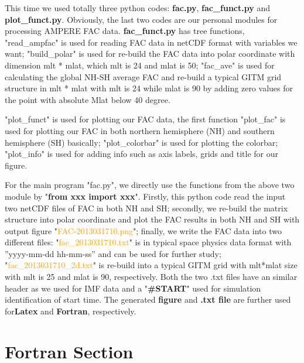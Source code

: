 \documentclass[12pt, letterpaper]{article} %
\begin{document}
\noindent This time we used totally three python codes: \textbf{fac.py}, \textbf{fac\_{}funct.py} and \textbf{plot\_{}funct.py}. Obviously, the last two codes are our personal modules for processing AMPERE FAC data.  \textbf{fac\_{}funct.py} has tree functions, "read\_{}ampfac" is used for reading FAC data in netCDF format with variables we want; "build\_{}polar" is used for re-build the FAC data into polar coordinate with dimension mlt * mlat, which mlt is 24 and mlat is 50; "fac\_{}ave" is used for calculating the global NH-SH average FAC and re-build a typical GITM grid structure in mlt * mlat with mlt is 24 while mlat is 90 by adding zero values for the point with absolute Mlat below 40 degree. 


\noindent "plot\_{}funct" is used for plotting our FAC data, the first function "plot\_{}fac" is used for plotting our FAC in both northern hemisphere (NH) and southern hemisphere (SH) basically; "plot\_{}colorbar" is used for plotting the colorbar; "plot\_{}info" is used for adding info such as axis labels, grids and title for our figure. 

\noindent For the main program "fac.py", we directly use the functions from the above two module by "\textbf{from xxx import xxx}". Firstly, this python code read the input two netCDF files of FAC in both NH and SH; secondly, we re-build the matrix structure into polar coordinate and plot the FAC results in both NH and SH with output figure "\textcolor{orange}{FAC-2013031710.png}"; finally, we write the FAC data into two different files: "\textcolor{orange}{fac\_{}2013031710.txt}" is in typical space physics data format with ''yyyy-mm-dd hh-mm-ss'' and can be used for further study;  "\textcolor{orange}{fac\_{}2013031710\_{}2d.txt}" is re-build into a typical GITM grid with mlt*mlat size with mlt is 25 and mlat is 90, respectively. Both the two .txt files have an similar header as we used for IMF data and a "\textbf{\#START}" used for simulation identification of start time. The generated \textbf{figure} and \textbf{.txt file} are further used for\textbf{Latex} and \textbf{Fortran}, respectively. 


\section{Fortran Section} %
\end{document}
